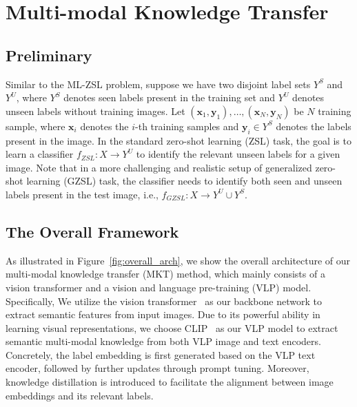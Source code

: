 \documentclass[letterpaper]{article} %
\begin{document}
\section{Multi-modal Knowledge Transfer}

\subsection{Preliminary}
Similar to the ML-ZSL problem, suppose we have two disjoint label sets $Y^{S}$ and $Y^{U}$, where $Y^{S}$ denotes seen labels present in the training set and $Y^{U}$ denotes unseen labels without training images.
Let $\left(\mathbf{x}_{1}, \mathbf{y}_{1}\right), \ldots,\left(\mathbf{x}_{N}, \mathbf{y}_{N}\right)$ be $N$ training sample, where $\mathbf{x}_{i}$ denotes the $i$-th training samples and $\mathbf{y}_{i} \in Y^{S}$ denotes the labels present in the image.
In the standard zero-shot learning (ZSL) task, the goal is to learn a classifier $f_{Z S L}: X \rightarrow Y^{U}$ to identify the relevant unseen labels for a given image.
Note that in a more challenging and realistic setup of generalized zero-shot learning (GZSL) task, the classifier needs to identify both seen and unseen labels present in the test image, i.e., $f_{G Z S L}: X \rightarrow Y^{U} \cup Y^{S}$. \par

\subsection{The Overall Framework}
As illustrated in Figure~\ref{fig:overall_arch}, we show the overall architecture of our multi-modal knowledge transfer (MKT) method, which mainly consists of a vision transformer and a vision and language pre-training (VLP) model.
Specifically,
We utilize the vision transformer~\cite{vit} as our  backbone network to extract semantic features from input images.
Due to its powerful ability in learning visual representations,
we choose CLIP~\cite{clip} as our VLP model to extract semantic multi-modal knowledge from both VLP image and text encoders.
Concretely, the label embedding is first generated based on the VLP text encoder, followed by further updates through prompt tuning.
Moreover, knowledge distillation is introduced to facilitate the alignment between image embeddings and its relevant labels.
\end{document}
